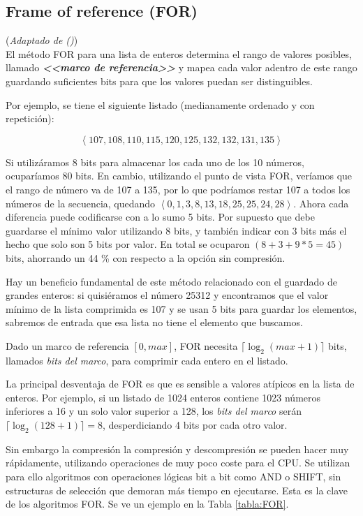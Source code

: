 \subsection{Frame of reference (FOR)}

(\noindent \textit{Adaptado de \citet[p.~5]{Delbru10adaptiveframe} (\citeyear{Delbru10adaptiveframe})})
\\

El método FOR para una lista de enteros determina el rango de valores posibles, llamado \textit\textbf{<<marco de referencia>>} y mapea cada valor adentro de este rango guardando suficientes bits para que los valores puedan ser distinguibles. 

Por ejemplo, se tiene el siguiente listado (medianamente ordenado y con repetición): 

\[\left< 107,108,110,115,120,125,132,132,131,135 \right> \]

Si utilizáramos 8 bits para almacenar los cada uno de los 10 números, ocuparíamos 80 bits. En cambio, utilizando el punto de vista FOR, veríamos que el rango de número va de 107 a 135, por lo que podríamos restar 107 a todos los números de la secuencia, quedando $\left< 0, 1, 3, 8, 13, 18, 25, 25, 24, 28 \right>$. Ahora cada diferencia puede codificarse con a lo sumo 5 bits. Por supuesto que debe guardarse el mínimo valor utilizando 8 bits, y también indicar con 3 bits más el hecho que solo son 5 bits por valor. En total se ocuparon $(8+3+9*5=45)$ bits, ahorrando un 44 \% con respecto a la opción sin compresión.

Hay un beneficio fundamental de este método relacionado con el guardado de grandes enteros: si quisiéramos el número 25312 y encontramos que el valor mínimo de la lista comprimida es 107 y se usan 5 bits para guardar los elementos, sabremos de entrada que esa lista no tiene el elemento que buscamos.

Dado un marco de referencia $[0, max]$, FOR necesita $\lceil \log_2(max+1) \rceil$ bits, llamados \textit{bits del marco}, para comprimir cada entero en el listado. 

La principal desventaja de FOR es que es sensible a valores atípicos en la lista de enteros. Por ejemplo, si un listado de 1024 enteros contiene 1023 números inferiores a 16 y un solo valor superior a 128, los \textit{bits del marco} serán $\lceil \log_2(128+1) \rceil = 8$, desperdiciando 4 bits por cada otro valor.

Sin embargo la compresión la compresión y descompresión se pueden hacer muy rápidamente, utilizando operaciones de muy poco coste para el CPU. Se utilizan para ello algoritmos con operaciones lógicas bit a bit como AND o SHIFT, sin estructuras de selección que demoran más tiempo en ejecutarse. Esta es la clave de los algoritmos FOR. Se ve un ejemplo en la Tabla \ref{tabla:FOR}.

